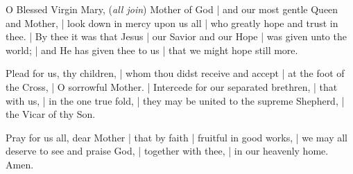 \begin{otherlanguage}{english}{\par}

{\par}


O Blessed Virgin Mary, (\textit{all join}) Mother of God | and our most gentle Queen and Mother, | look down in mercy upon us all | who greatly hope and trust in thee. | By thee it was that Jesus | our Savior and our Hope | was given unto the world; | and He has given thee to us | that we might hope still more.

Plead for us, thy children, | whom thou didst receive and accept | at the foot of the Cross, | O sorrowful Mother. | Intercede for our separated brethren, | that with us, | in the one true fold, | they may be united to the supreme Shepherd, | the Vicar of thy Son.

Pray for us all, dear Mother | that by faith | fruitful in good works, | we may all deserve to see and praise God, | together with thee, | in our heavenly home. Amen.

\end{otherlanguage}


